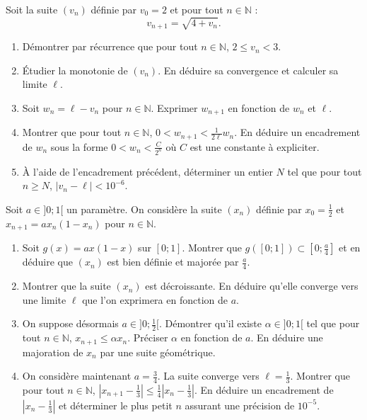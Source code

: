 \documentclass[11pt]{article}
\begin{document}
\begin{exercice}
Soit la suite $(v_n)$ définie par $v_0=2$ et pour tout $n\in\mathbb{N}$ :
$$v_{n+1}=\sqrt{4+v_n}.$$
\begin{enumerate}
    \item Démontrer par récurrence que pour tout $n\in\mathbb{N}$, $2\leq v_n < 3$.
    \item Étudier la monotonie de $(v_n)$. En déduire sa convergence et calculer sa limite $\ell$.
    \item Soit $w_n = \ell - v_n$ pour $n\in\mathbb{N}$. Exprimer $w_{n+1}$ en fonction de $w_n$ et $\ell$.
    \item Montrer que pour tout $n\in\mathbb{N}$, $0 < w_{n+1} < \frac{1}{2\ell}w_n$.
    En déduire un encadrement de $w_n$ sous la forme $0 < w_n < \frac{C}{2^n}$ où $C$ est une constante à expliciter.
    \item À l'aide de l'encadrement précédent, déterminer un entier $N$ tel que pour tout $n\geq N$, $|v_n-\ell|<10^{-6}$.
\end{enumerate}
\end{exercice}

\begin{exercice}
Soit $a\in]0;1[$ un paramètre. On considère la suite $(x_n)$ définie par $x_0=\frac{1}{2}$ et $x_{n+1}=a x_n(1-x_n)$ pour $n\in\mathbb{N}$.
\begin{enumerate}
    \item Soit $g(x)=ax(1-x)$ sur $[0;1]$. Montrer que $g([0;1])\subset[0;\frac{a}{4}]$ et en déduire que $(x_n)$ est bien définie et majorée par $\frac{a}{4}$.
    \item Montrer que la suite $(x_n)$ est décroissante. En déduire qu'elle converge vers une limite $\ell$ que l'on exprimera en fonction de $a$.
    \item On suppose désormais $a\in]0;\frac{1}{2}[$.
    Démontrer qu'il existe $\alpha\in]0;1[$ tel que pour tout $n\in\mathbb{N}$, $x_{n+1}\leq \alpha x_n$.
    Préciser $\alpha$ en fonction de $a$. En déduire une majoration de $x_n$ par une suite géométrique.
    \item On considère maintenant $a=\frac{3}{4}$. La suite converge vers $\ell=\frac{1}{3}$.
    Montrer que pour tout $n\in\mathbb{N}$, $|x_{n+1}-\frac{1}{3}| \leq \frac{1}{4}|x_n-\frac{1}{3}|$.
    En déduire un encadrement de $|x_n-\frac{1}{3}|$ et déterminer le plus petit $n$ assurant une précision de $10^{-5}$.
\end{enumerate}
\end{exercice}
\end{document}
